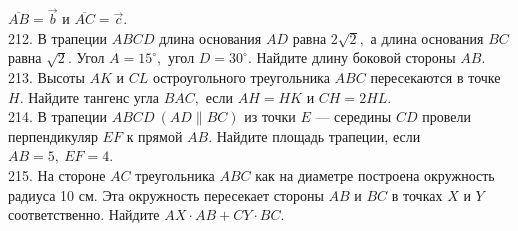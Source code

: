 \documentclass[12pt]{article}
\begin{document}
$\overline{AB}=\vec{b}$ и  $\overline{AC}=\vec{c}.$\\
212. В трапеции  $ABCD$ длина основания  $AD$ равна  $2\sqrt{2},$ а длина основания  $BC$ равна  $\sqrt{2}.$ Угол $A=15^\circ,$
угол $D=30^\circ.$ Найдите длину боковой стороны  $AB.$\\
213. Высоты  $AK$ и  $CL$ остроугольного треугольника  $ABC$ пересекаются в точке  $H.$ Найдите тангенс угла
$BAC,$ если  $AH=HK$ и  $CH=2HL.$\\
214. В трапеции  $ABCD\  (AD\parallel BC)$ из точки  $E$ --- середины  $CD$ провели перпендикуляр  $EF$ к прямой  $AB.$
Найдите площадь трапеции, если  $AB=5,\ EF=4.$\\
215. На стороне  $AC$ треугольника  $ABC$ как на диаметре построена окружность радиуса 10 см. Эта
окружность пересекает стороны  $AB$ и  $BC$ в точках  $X$ и  $Y$ соответственно. Найдите  $AX\cdot AB + CY\cdot BC.$
\newpage
\end{document}
